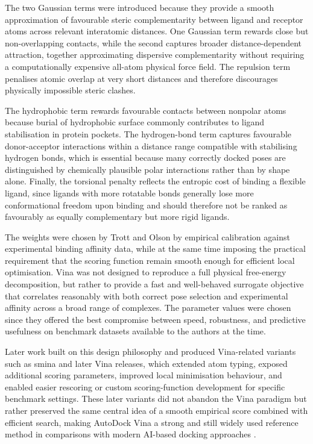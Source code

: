 The two Gaussian terms were introduced because they provide a smooth approximation of favourable steric complementarity between ligand and receptor atoms across relevant interatomic distances. One Gaussian term rewards close but non-overlapping contacts, while the second captures broader distance-dependent attraction, together approximating dispersive complementarity without requiring a computationally expensive all-atom physical force field. The repulsion term penalises atomic overlap at very short distances and therefore discourages physically impossible steric clashes.

The hydrophobic term rewards favourable contacts between nonpolar atoms because burial of hydrophobic surface commonly contributes to ligand stabilisation in protein pockets. The hydrogen-bond term captures favourable donor-acceptor interactions within a distance range compatible with stabilising hydrogen bonds, which is essential because many correctly docked poses are distinguished by chemically plausible polar interactions rather than by shape alone. Finally, the torsional penalty reflects the entropic cost of binding a flexible ligand, since ligands with more rotatable bonds generally lose more conformational freedom upon binding and should therefore not be ranked as favourably as equally complementary but more rigid ligands.

The weights were chosen by Trott and Olson \cite{ref022} by empirical calibration against experimental binding affinity data, while at the same time imposing the practical requirement that the scoring function remain smooth enough for efficient local optimisation. Vina was not designed to reproduce a full physical free-energy decomposition, but rather to provide a fast and well-behaved surrogate objective that correlates reasonably with both correct pose selection and experimental affinity across a broad range of complexes. The parameter values were chosen since they offered the best compromise between speed, robustness, and predictive usefulness on benchmark datasets available to the authors at the time.

Later work built on this design philosophy and produced Vina-related variants such as smina and later Vina releases, which extended atom typing, exposed additional scoring parameters, improved local minimisation behaviour, and enabled easier rescoring or custom scoring-function development for specific benchmark settings. These later variants did not abandon the Vina paradigm but rather preserved the same central idea of a smooth empirical score combined with efficient search, making AutoDock Vina a strong and still widely used reference method in comparisons with modern AI-based docking approaches \cite{ref013}.

